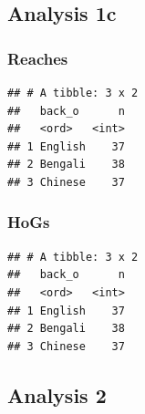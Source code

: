 \documentclass[]{article}
\newenvironment{Shaded}{\begin{snugshade}}{\end{snugshade}}
\newcommand{\DataTypeTok}[1]{\textcolor[rgb]{0.13,0.29,0.53}{#1}}
\newcommand{\KeywordTok}[1]{\textcolor[rgb]{0.13,0.29,0.53}{\textbf{#1}}}
\newcommand{\NormalTok}[1]{#1}
\newcommand{\OperatorTok}[1]{\textcolor[rgb]{0.81,0.36,0.00}{\textbf{#1}}}
\newcommand{\StringTok}[1]{\textcolor[rgb]{0.31,0.60,0.02}{#1}}
\begin{document}
\hypertarget{analysis-1c}{%
\subsection{Analysis 1c}\label{analysis-1c}}

\hypertarget{reaches-4}{%
\subsubsection{Reaches}\label{reaches-4}}

\begin{Shaded}
\end{Shaded}

\begin{verbatim}
## # A tibble: 3 x 2
##   back_o      n
##   <ord>   <int>
## 1 English    37
## 2 Bengali    38
## 3 Chinese    37
\end{verbatim}

\hypertarget{hogs-2}{%
\subsubsection{HoGs}\label{hogs-2}}

\begin{Shaded}
\end{Shaded}

\begin{verbatim}
## # A tibble: 3 x 2
##   back_o      n
##   <ord>   <int>
## 1 English    37
## 2 Bengali    38
## 3 Chinese    37
\end{verbatim}

\hypertarget{analysis-2}{%
\subsection{Analysis 2}\label{analysis-2}}
\end{document}
